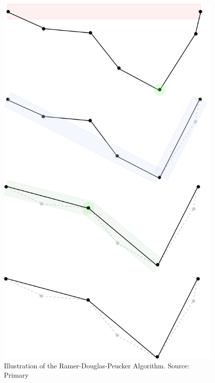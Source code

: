 \begin{figure}[H]
    \centering
    \includegraphics[scale=0.1]{figure/douglas_peucker_illustration.png}
    \caption{Illustration of the Ramer-Douglas-Peucker Algorithm. Source: Primary}
    \label{fig:douglas_peucker}
\end{figure}

